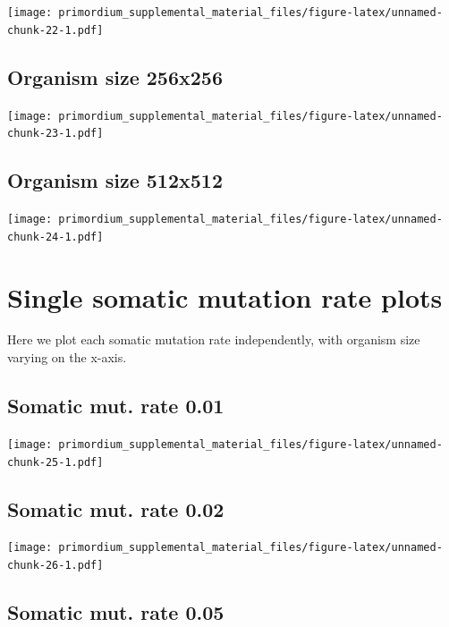 \documentclass[
]{book}
\begin{document}
\texttt{[image: primordium\_supplemental\_material\_files/figure-latex/unnamed-chunk-22-1.pdf]}

\hypertarget{organism-size-256x256}{%
\subsection{Organism size 256x256}\label{organism-size-256x256}}

\texttt{[image: primordium\_supplemental\_material\_files/figure-latex/unnamed-chunk-23-1.pdf]}

\hypertarget{organism-size-512x512}{%
\subsection{Organism size 512x512}\label{organism-size-512x512}}

\texttt{[image: primordium\_supplemental\_material\_files/figure-latex/unnamed-chunk-24-1.pdf]}

\hypertarget{single-somatic-mutation-rate-plots}{%
\section{Single somatic mutation rate plots}\label{single-somatic-mutation-rate-plots}}

Here we plot each somatic mutation rate independently, with organism size varying on the x-axis.

\hypertarget{somatic-mut.-rate-0.01}{%
\subsection{Somatic mut. rate 0.01}\label{somatic-mut.-rate-0.01}}

\texttt{[image: primordium\_supplemental\_material\_files/figure-latex/unnamed-chunk-25-1.pdf]}

\hypertarget{somatic-mut.-rate-0.02}{%
\subsection{Somatic mut. rate 0.02}\label{somatic-mut.-rate-0.02}}

\texttt{[image: primordium\_supplemental\_material\_files/figure-latex/unnamed-chunk-26-1.pdf]}

\hypertarget{somatic-mut.-rate-0.05}{%
\subsection{Somatic mut. rate 0.05}\label{somatic-mut.-rate-0.05}}
\end{document}
